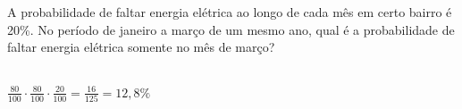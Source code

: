 \begin{ex}
A probabilidade de faltar energia elétrica ao longo de cada mês em certo bairro é 20\%. No período de janeiro a março de um mesmo ano, qual é a probabilidade de faltar energia elétrica somente no mês de março?
 \begin{sol}
  \phantom{A}\\
  $\frac{80}{100}\cdot\frac{80}{100}\cdot\frac{20}{100}=\frac{16}{125}=12,8\%$ 
  \end{sol}
\end{ex}